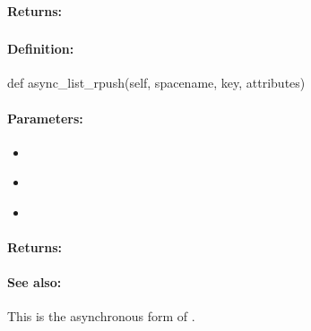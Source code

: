 \paragraph{Returns:}


\pagebreak
\subsubsection{}
\label{api:python:async_list_rpush}


\paragraph{Definition:}
\begin{pythoncode}
def async_list_rpush(self, spacename, key, attributes)
\end{pythoncode}

\paragraph{Parameters:}
\begin{itemize}[noitemsep]
\item {}\\

\item {}\\

\item {}\\

\end{itemize}

\paragraph{Returns:}


\paragraph{See also:}  This is the asynchronous form of .

\pagebreak
\subsubsection{}
\label{api:python:uxact_list_rpush}


